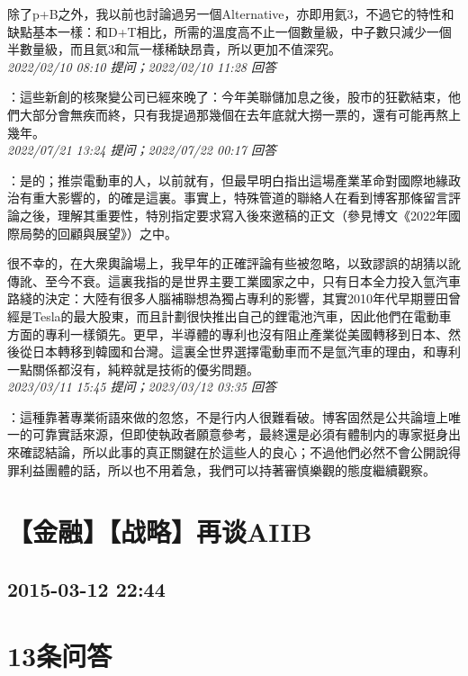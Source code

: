 \documentclass[twocolumn]{ctexart}
\begin{document}
除了p+B之外，我以前也討論過另一個Alternative，亦即用氦3，不過它的特性和缺點基本一樣：和D+T相比，所需的溫度高不止一個數量級，中子數只減少一個半數量級，而且氦3和氚一樣稀缺昂貴，所以更加不值深究。
\\

\textit{\hfill\noindent\small 2022/02/10 08:10 提问；2022/02/10 11:28 回答}

：這些新創的核聚變公司已經來晚了：今年美聯儲加息之後，股市的狂歡結束，他們大部分會無疾而終，只有我提過那幾個在去年底就大撈一票的，還有可能再熬上幾年。
\\

\textit{\hfill\noindent\small 2022/07/21 13:24 提问；2022/07/22 00:17 回答}

：是的；推崇電動車的人，以前就有，但最早明白指出這場產業革命對國際地緣政治有重大影響的，的確是這裏。事實上，特殊管道的聯絡人在看到博客那條留言評論之後，理解其重要性，特別指定要求寫入後來邀稿的正文（參見博文《2022年國際局勢的回顧與展望》）之中。

很不幸的，在大衆輿論場上，我早年的正確評論有些被忽略，以致謬誤的胡猜以訛傳訛、至今不衰。這裏我指的是世界主要工業國家之中，只有日本全力投入氫汽車路綫的決定：大陸有很多人腦補聯想為獨占專利的影響，其實2010年代早期豐田曾經是Tesla的最大股東，而且計劃很快推出自己的鋰電池汽車，因此他們在電動車方面的專利一樣領先。更早，半導體的專利也沒有阻止產業從美國轉移到日本、然後從日本轉移到韓國和台灣。這裏全世界選擇電動車而不是氫汽車的理由，和專利一點關係都沒有，純粹就是技術的優劣問題。
\\

\textit{\hfill\noindent\small 2023/03/11 15:45 提问；2023/03/12 03:35 回答}

：這種靠著專業術語來做的忽悠，不是行内人很難看破。博客固然是公共論壇上唯一的可靠實話來源，但即使執政者願意參考，最終還是必須有體制内的專家挺身出來確認結論，所以此事的真正關鍵在於這些人的良心；不過他們必然不會公開說得罪利益團體的話，所以也不用着急，我們可以持著審慎樂觀的態度繼續觀察。
\\


\section{【金融】【战略】再谈AIIB}
\subsection{2015-03-12 22:44}


\section{13条问答}
\end{document}
